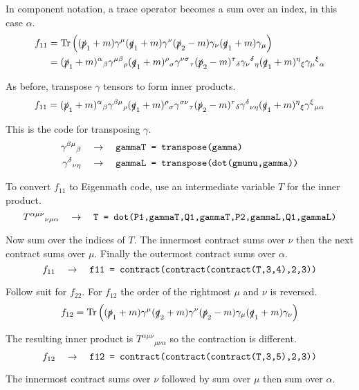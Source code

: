 \documentclass[12pt]{article}
\begin{document}
In component notation, a trace operator becomes a sum over an index, in this case $\alpha$.
\begin{align*}
f_{11}
&=
\mathop{\rm Tr}
\left(
(\slashed{p}_1+m)\gamma^\mu(\slashed{q}_1+m)\gamma^\nu(\slashed{p}_2-m)\gamma_\nu(\slashed{q}_1+m)\gamma_\mu
\right)\\
&=
(\slashed{p}_1+m)^\alpha{}_\beta
\gamma^{\mu\beta}{}_\rho
(\slashed{q}_1+m)^\rho{}_\sigma
\gamma^{\nu\sigma}{}_\tau
(\slashed{p}_2-m)^\tau{}_\delta
\gamma_\nu{}^\delta{}_\eta
(\slashed{q}_1+m)^\eta{}_\xi
\gamma_\mu{}^\xi{}_\alpha
\end{align*}

As before, transpose $\gamma$ tensors to form inner products.
\begin{equation*}
f_{11}=
(\slashed{p}_1+m)^\alpha{}_\beta
\gamma^{\beta\mu}{}_\rho
(\slashed{q}_1+m)^\rho{}_\sigma
\gamma^{\sigma\nu}{}_\tau
(\slashed{p}_2-m)^\tau{}_\delta
\gamma^\delta{}_{\nu\eta}
(\slashed{q}_1+m)^\eta{}_\xi
\gamma^\xi{}_{\mu\alpha}
\end{equation*}

This is the code for transposing $\gamma$.
\begin{align*}
\gamma^{\beta\mu}{}_\beta
&\quad\rightarrow\quad
\text{\tt gammaT = transpose(gamma)}
\\
\gamma^\delta{}_{\nu\eta}
&\quad\rightarrow\quad
\text{\tt gammaL = transpose(dot(gmunu,gamma))}
\end{align*}

To convert $f_{11}$ to Eigenmath code, use an intermediate variable $T$ for the inner product.
\begin{equation*}
T^{\alpha\mu\nu}{}_{\nu\mu\alpha}
\quad\rightarrow\quad
\text{\tt T = dot(P1,gammaT,Q1,gammaT,P2,gammaL,Q1,gammaL)}
\end{equation*}

Now sum over the indices of $T$.
The innermost contract sums over $\nu$ then the next contract sums over $\mu$.
Finally the outermost contract sums over $\alpha$.
\begin{equation*}
f_{11}\quad\rightarrow\quad
\text{\tt f11 = contract(contract(contract(T,3,4),2,3))}
\end{equation*}

Follow suit for $f_{22}$.
For $f_{12}$ the order of the rightmost $\mu$ and $\nu$ is reversed.
\begin{equation*}
f_{12}=\mathop{\rm Tr}
\left(
(\slashed{p}_1+m)\gamma^\mu(\slashed{q}_2+m)\gamma^\nu(\slashed{p}_2-m)\gamma_\mu(\slashed{q}_1+m)\gamma_\nu
\right)
\end{equation*}

The resulting inner product is $T^{\alpha\mu\nu}{}_{\mu\nu\alpha}$
so the contraction is different.
\begin{equation*}
f_{12}
\quad\rightarrow\quad
\text{\tt f12 = contract(contract(contract(T,3,5),2,3))}
\end{equation*}

The innermost contract sums over $\nu$ followed by sum over $\mu$ then sum over $\alpha$.
\end{document}
